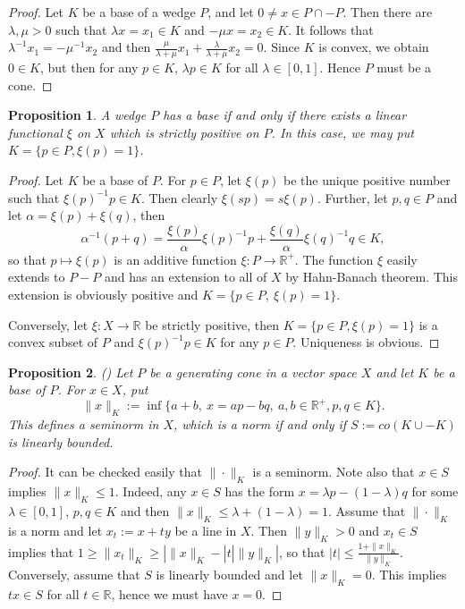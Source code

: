 \documentclass[12pt]{article}
\newtheorem{prop}{Proposition}
\theoremstyle{remark}
\newcommand{\<}{\langle}
\begin{document}
\begin{proof} Let $K$ be a base of a wedge $P$, and let $0\neq x\in P\cap -P$. Then there are $\lambda,\mu >0$ such that $\lambda x=x_1\in K$ and $-\mu x=x_2\in K$.  
It follows that $\lambda^{-1}x_1=-\mu^{-1}x_2$ and then  $\tfrac{\mu}{\lambda+\mu}x_1+\tfrac{\lambda}{\lambda+\mu}x_2=0$. Since $K$ is convex, we obtain $0\in K$, but then 
 for any $p\in K$,  $\lambda p\in K$ for all $\lambda\in[0,1]$. Hence $P$ must be a cone. 

\end{proof}

\begin{prop} \label{prop:base} A wedge  $P$ has a base if and only if there exists a linear functional $\xi$ on $X$ which is strictly positive on $P$. In this case, we may put 
 $K=\{p\in P, \xi(p)=1\}$. 
\end{prop}

\begin{proof}  Let $K$ be a base of $P$. For $p\in P$, let $\xi(p)$ be the unique positive number such that 
$\xi(p)^{-1}p\in K$. Then clearly $\xi(sp)=s\xi(p)$. Further, let $p,q\in P$ and let $\alpha=\xi(p)+\xi(q)$, then 
\[
\alpha^{-1}(p+q)=\frac{\xi(p)}{\alpha} \xi(p)^{-1}p+ \frac{\xi(q)}{\alpha} \xi(q)^{-1}q\in K,
\]
so that  $p\mapsto \xi(p)$ is an additive function  $\xi: P\to \mathbb R^+$. The function $\xi$ easily extends to $P-P$ and has an extension to all of $X$ by Hahn-Banach theorem. This extension is obviously positive and $K=\{p\in P,\ \xi(p)=1\}$.  

Conversely, let $\xi:X\to \mathbb R$ be strictly positive, then $K=\{p\in P, \xi(p)=1\}$ is a convex subset of $P$ and $\xi(p)^{-1}p\in K$ for any $p\in P$. Uniqueness is obvious. 



\end{proof}



\begin{prop} (\cite{ellis}) Let $P$ be a generating cone in a vector space $X$ and let $K$ be a base of $P$. For $x\in X$, put 
\[
\|x\|_K:=\inf\{a+b,\ x=a p-b q,\ a,b\in \mathbb R^+, p,q\in K\}.
\]
This defines a seminorm in $X$, which is a norm if and only if $S:=co(K\cup -K)$ is linearly bounded. 

\end{prop}

\begin{proof}
It can be checked easily that $\|\cdot\|_K$ is a seminorm. Note also that $x\in S$ implies $\|x\|_K\le 1$. Indeed, any $x\in S$ has the form $x=\lambda p-(1-\lambda)q$ for some  $\lambda\in [0,1]$, $p,q\in K$ and then  $\|x\|_K\le \lambda+(1-\lambda)=1$.  
Assume that $\|\cdot\|_K$ is a norm and let $x_t:=x+ty$ be a line in $X$. Then $\|y\|_K>0$ and $x_t\in  S$ implies that $1\ge \|x_t\|_K\ge |\|x\|_K-|t|\|y\|_K|$, so that $|t|\le \tfrac{1+\|x\|_K}{\|y\|_K}$. Conversely, assume that $S$ is linearly bounded and let $\|x\|_K=0$. This implies $tx\in S$ for all $t\in \mathbb R$, hence we must have 
$x=0$. 
 

\end{proof}
\end{document}
